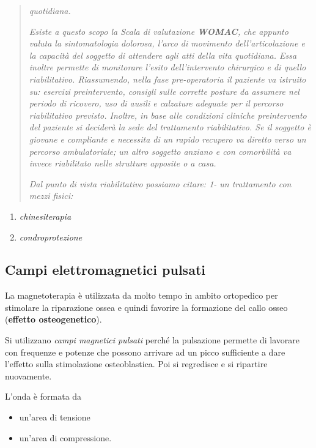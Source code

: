 \documentclass[]{article}
\begin{document}
\begin{quote}
\emph{quotidiana.}

\emph{Esiste a questo scopo la Scala di valutazione \textbf{WOMAC}, che
appunto valuta la sintomatologia dolorosa, l'arco di movimento
dell'articolazione e la capacità del soggetto di attendere agli atti
della vita quotidiana. Essa inoltre permette di monitorare l'esito
dell'intervento chirurgico e di quello riabilitativo. Riassumendo, nella
fase pre-operatoria il paziente va istruito su: esercizi preintervento,
consigli sulle corrette posture da assumere nel periodo di ricovero, uso
di ausili e calzature adeguate per il percorso riabilitativo previsto.
Inoltre, in base alle condizioni cliniche preintervento del paziente si
deciderà la sede del trattamento riabilitativo. Se il soggetto è giovane
e compliante e necessita di un rapido recupero va diretto verso un
percorso ambulatoriale; un altro soggetto anziano e con comorbilità va
invece riabilitato nelle strutture apposite o a casa.}

\emph{Dal punto di vista riabilitativo possiamo citare: 1- un
trattamento con mezzi fisici:}
\end{quote}

\begin{enumerate}
\def\labelenumi{\arabic{enumi}.}
\setcounter{enumi}{1}
\item
  \emph{chinesiterapia}
\item
  \emph{condroprotezione}
\end{enumerate}

\subsection{Campi elettromagnetici
pulsati}\label{campi-elettromagnetici-pulsati}

La magnetoterapia è utilizzata da molto tempo in ambito ortopedico per
stimolare la riparazione ossea e quindi favorire la formazione del callo
osseo (\textbf{effetto osteogenetico}).

Si utilizzano \emph{campi magnetici pulsati} perché la pulsazione
permette di lavorare con frequenze e potenze che possono arrivare ad un
picco sufficiente a dare l'effetto sulla stimolazione osteoblastica. Poi
si regredisce e si ripartire nuovamente.

L'onda è formata da

\begin{itemize}
\item
  un'area di tensione
\item
  un'area di compressione.
\end{itemize}
\end{document}
